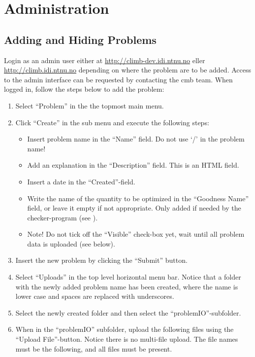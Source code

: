 \chapter{Administration}
\label{apdx:problems}

\section{Adding and Hiding Problems}
Login as an admin user either at \url{http://climb-dev.idi.ntnu.no} eller \url{http://climb.idi.ntnu.no} depending on where the problem are to be added. Access to the admin interface can be requested by contacting the \gls{cmb} team. When logged in, follow the steps below to add the problem:
\begin{enumerate}
  \item Select ``Problem'' in the the topmost main menu.
  \item Click ``Create'' in the sub menu and execute the following steps:
  \begin{itemize}
    \item Insert problem name in the ``Name'' field. Do not use ‘/’ in the problem name!
    \item Add an explanation in the ``Description'' field. This is an HTML field.
    \item Insert a date in the ``Created''-field.
    \item Write the name of the quantity to be optimized in the ``Goodness Name'' field, or leave it empty if not appropriate. Only added if needed by the checker-program (see ).
    \item Note! Do not tick off the ``Visible'' check-box yet, wait until all problem data is uploaded (see below).
  \end{itemize}
  \item Insert the new problem by clicking the ``Submit'' button.
  \item Select ``Uploads'' in the top level horizontal menu bar. Notice that a folder with the newly added problem name has been created, where the name is lower case and spaces are replaced with underscores.
  \item Select the newly created folder and then select the ``problemIO''-subfolder.
  \item When in the ``problemIO'' subfolder, upload the following files using the ``Upload File''-button. Notice there is no multi-file upload. The file names must be the following, and all files must be present.

\end{enumerate}
